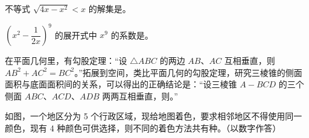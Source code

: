 \begin{question}
不等式 $\sqrt{4x-x^2}<x$ 的解集是\gkblank{}。

\end{question}
\begin{question}
$\left(x^2-\dfrac1{2x}\right)^9$ 的展开式中 $x^9$ 的系数是\gkblank{}。

\end{question}
\begin{question}
在平面几何里，有勾股定理：“设 $\triangle ABC$ 的两边 $AB\text{、}AC$ 互相垂直，则 $AB^2+AC^2=BC^2$。”拓展到空间，类比平面几何的勾股定理，研究三棱锥的侧面面积与底面面积间的关系，可以得出的正确结论是：“设三棱锥 $A-BCD$ 的三个侧面 $ABC\text{、}ACD\text{、}ADB$ 两两互相垂直，则\gkblank{}。”

\Needspace{0.4\textheight}
\end{question}
\begin{question}
如图，一个地区分为 5 个行政区域，现给地图着色，要求相邻地区不得使用同一颜色，现有 4 种颜色可供选择，则不同的着色方法共有\gkblank{}种。（以数字作答）
\nopagebreak[4]
\begin{center}\end{center}
\nopagebreak[4]
\end{question}

